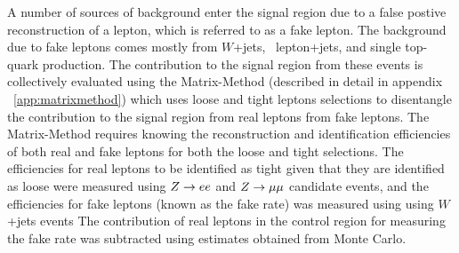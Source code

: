 
A number of sources of background enter the signal region due to a false postive reconstruction
of a lepton, which is referred to as a fake lepton.
The background due to fake leptons comes mostly from $W$+jets, \ttbar\, lepton+jets, and single top-quark production.
The contribution to the signal region from these events is collectively evaluated
using the Matrix-Method (described in detail in appendix ~\ref{app:matrixmethod}) which uses loose and tight
leptons selections to disentangle the contribution to the signal region from
real leptons from fake leptons.
The Matrix-Method requires knowing the reconstruction and identification efficiencies of both
real and fake leptons for both the loose and tight selections.
The efficiencies for real leptons to be identified as tight given that they are identified as loose
were measured using $Z \rightarrow ee$ and $Z \rightarrow \mu\mu$ candidate events, and the efficiencies for fake leptons
(known as the fake rate) was measured using using $W$+jets events
The contribution of real leptons in the control region for measuring the fake rate was 
subtracted using estimates obtained from Monte Carlo.


